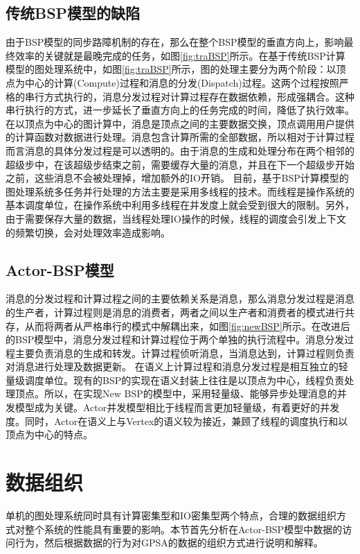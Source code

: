 \subsection{传统BSP模型的缺陷}
由于BSP模型的同步路障机制的存在，那么在整个BSP模型的垂直方向上，影响最终效率的关键就是最晚完成的任务，如图\ref{fig:traBSP}所示。在基于传统BSP计算模型的图处理系统中，如图\ref{fig:traBSP}所示，图的处理主要分为两个阶段：以顶点为中心的计算(Compute)过程和消息的分发(Dispatch)过程。这两个过程按照严格的串行方式执行的，消息分发过程对计算过程存在数据依赖，形成强耦合。这种串行执行的方式，进一步延长了垂直方向上的任务完成的时间，降低了执行效率。在以顶点为中心的图计算中，消息是顶点之间的主要数据交换，顶点调用用户提供的计算函数对数据进行处理。消息包含计算所需的全部数据，所以相对于计算过程而言消息的具体分发过程是可以透明的。由于消息的生成和处理分布在两个相邻的超级步中，在该超级步结束之前，需要缓存大量的消息，并且在下一个超级步开始之前，这些消息不会被处理掉，增加额外的IO开销。
目前，基于BSP计算模型的图处理系统多任务并行处理的方法主要是采用多线程的技术。而线程是操作系统的基本调度单位，在操作系统中利用多线程在并发度上就会受到很大的限制。另外，由于需要保存大量的数据，当线程处理IO操作的时候，线程的调度会引发上下文的频繁切换，会对处理效率造成影响。

\subsection{Actor-BSP模型}

消息的分发过程和计算过程之间的主要依赖关系是消息，那么消息分发过程是消息的生产者，计算过程则是消息的消费者，两者之间以生产者和消费者的模式进行共存，从而将两者从严格串行的模式中解耦出来，如图\ref{fig:newBSP}所示。在改进后的BSP模型中，消息分发过程和计算过程位于两个单独的执行流程中。消息分发过程主要负责消息的生成和转发。计算过程侦听消息，当消息达到，计算过程则负责对消息进行处理及数据更新。
在语义上计算过程和消息分发过程是相互独立的轻量级调度单位。现有的BSP的实现在语义封装上往往是以顶点为中心，线程负责处理顶点。所以，在实现New BSP的模型中，采用轻量级、能够异步处理消息的并发模型成为关键。Actor并发模型相比于线程而言更加轻量级，有着更好的并发度。同时，Actor在语义上与Vertex的语义较为接近，兼顾了线程的调度执行和以顶点为中心的特点。



\section{数据组织}

单机的图处理系统同时具有计算密集型和IO密集型两个特点，合理的数据组织方式对整个系统的性能具有重要的影响。本节首先分析在Actor-BSP模型中数据的访问行为，然后根据数据的行为对GPSA的数据的组织方式进行说明和解释。

